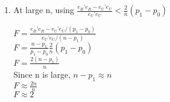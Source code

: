 \documentclass{article}
\begin{document}
\begin{enumerate}[label=(\alph*)]
	\item At large n, using $\frac{e_{R}’e_{R} - e_{U}’e_{U}}{e_{U}’e_{U}} < \frac{2}{n}(p_{1} - p_{0}) $\\[6pt]
	
	\begin{center}
	$F = \frac{e_{R}’e_{R} - e_{U}’e_{U}/(p_{1} - p_{0})}{e_{U}’e_{U}/(n-p_{1})}$ \\ [6pt]
	$F = \frac{n-p_{1}}{p_{1}-p_{0}}\frac{2}{n}(p_{1}-p_{0})$ \\[6pt]
	$F = \frac{2(n-p_{1})}{n}$ \\
	\smallbreak
	Since n is large, $n-p_{1} \approx n$ \\[6pt]
	$F \approx \frac{2n}{n}$ \\[6pt]
	$F \approx 2$ \\
	\end{center}
	


\end{enumerate}
\end{document}
